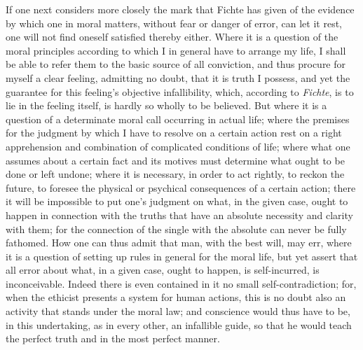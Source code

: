 \documentclass[12pt,a4paper,openany]{book}
\newcommand{\opage}[1]{\marginnote{\footnotesize\textit{[#1]}}}
\begin{document}
If one next considers more closely the mark that Fichte has given of the evidence by
which one in moral matters, without fear or danger of error, can let it rest, one
will not find oneself satisfied thereby either. Where it is a question of the moral
principles according to which I in general have to arrange my life, I shall be able
to refer them to the basic source of all conviction, and thus procure for myself a
clear feeling, admitting no doubt, that it is truth I possess, and yet the guarantee
for this feeling's objective infallibility, which, according to \emph{Fichte}, is to
lie in the feeling itself, is hardly so wholly
\setcounter{footnote}{0}%
\opage{95}to be believed. But where it is a question of a determinate moral call occurring in
actual life; where the premises for the judgment by which I have to resolve on a
certain action rest on a right apprehension and combination of complicated
conditions of life; where what one assumes about a certain fact and its motives must
determine what ought to be done or left undone; where it is necessary, in order to
act rightly, to reckon the future, to foresee the physical or psychical consequences
of a certain action; there it will be impossible to put one's judgment on what, in
the given case, ought to happen in connection with the truths that have an absolute
necessity and clarity with them; for the connection of the single with the absolute
can never be fully fathomed. How one can thus admit that man, with the best will,
may err, where it is a question of setting up rules in general for the moral life,
but yet assert that all error about what, in a given case, ought to happen, is
self-incurred, is inconceivable. Indeed there is even contained in it no small
self-contradiction; for, when the ethicist presents a system for human actions, this
is no doubt also an activity that stands under the moral law; and conscience would
thus have to be, in this undertaking, as in every other, an infallible guide, so that
he would teach the perfect truth and in the most perfect manner.
\end{document}
